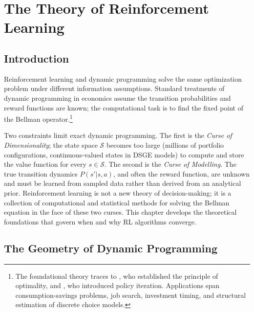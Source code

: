 
\section{The Theory of Reinforcement Learning}
\label{sec:planning_learning}

\subsection{Introduction}
\label{sec:ch2_intro}

Reinforcement learning and dynamic programming solve the same optimization problem under different information assumptions. Standard treatments of dynamic programming in economics \citep{StokeyLucas1989, Rust1987} assume the transition probabilities and reward functions are known; the computational task is to find the fixed point of the Bellman operator.\footnote{The foundational theory traces to \citet{Bellman1957}, who established the principle of optimality, and \citet{howard1960}, who introduced policy iteration. Applications span consumption-savings problems, job search, investment timing, and structural estimation of discrete choice models.}

Two constraints limit exact dynamic programming. The first is the \emph{Curse of Dimensionality}; the state space $\mathcal{S}$ becomes too large (millions of portfolio configurations, continuous-valued states in DSGE models) to compute and store the value function for every $s \in \mathcal{S}$. The second is the \emph{Curse of Modelling}. The true transition dynamics $P(s'|s,a)$, and often the reward function, are unknown and must be learned from sampled data rather than derived from an analytical prior. Reinforcement learning is not a new theory of decision-making; it is a collection of computational and statistical methods for solving the Bellman equation in the face of these two curses. This chapter develops the theoretical foundations that govern when and why RL algorithms converge.


\subsection{The Geometry of Dynamic Programming}
\label{sec:newton_connection}

